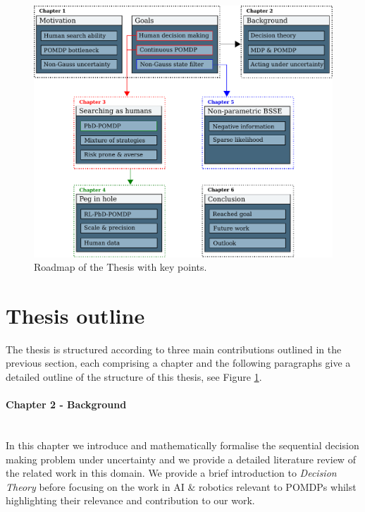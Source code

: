 
\begin{figure}
  \centering
  \includegraphics[width=\textwidth]{./ch1-Introduction/Figures/roadmap.pdf}
  \caption{Roadmap of the Thesis with key points. }
  \label{fig:rmap_thesis}
\end{figure}

\section{Thesis outline}

The thesis is structured according to three main contributions outlined in the previous section, 
each comprising a chapter and the following paragraphs give a detailed outline of the structure 
of this thesis, see Figure \ref{fig:rmap_thesis}.

\begin{minipage}[c]{0.9\textwidth}
\paragraph{Chapter 2 - Background}\\
In this chapter we introduce and mathematically formalise the sequential decision making problem 
under uncertainty and we provide a detailed literature review of the related work in this domain.
We provide a brief introduction to \textit{Decision Theory} before focusing on the work 
in AI \& robotics relevant to POMDPs whilst highlighting their relevance and contribution to our work. 
\end{minipage}

